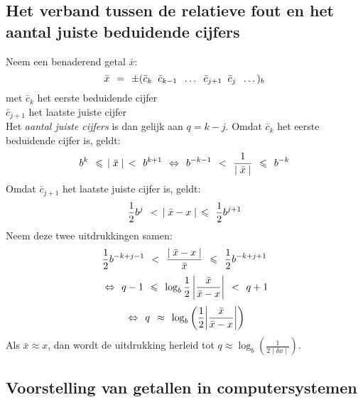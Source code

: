 \documentclass[11pt]{report}
\def \eq {\hspace{1.5mm}=\hspace{1.5mm}}
\def \lesseq {\hspace{1.5mm}\leqslant\hspace{1.5mm}}
\def \less {\hspace{1.5mm}<\hspace{1.5mm}}
\def \lrarrow {\hspace{1.5mm}\Leftrightarrow \hspace{1.5mm}}
\def \appx {\hspace{1.5mm}\approx \hspace{1.5mm}}
\def \h {\hspace{2mm}}
\begin{document}
	\subsection{Het verband tussen de relatieve fout en het aantal juiste beduidende cijfers}
	 Neem een benaderend getal $\bar x$:
	 $$\bar x \eq \pm (\bar c_k \h \bar c_{k-1} \h \dots \h \bar c_{j+1} \h \bar c_j \h \dots)_b$$
	 \hspace*{8.5mm}met \h $\bar c_k$ \hspace{5mm} het eerste beduidende cijfer\\
	 \hspace*{17mm} $\bar c_{j+1}$ \hspace{1.4mm} het laatste juiste cijfer\\
	 Het \textit{aantal juiste cijfers} is dan gelijk aan $q = k - j$. Omdat $\bar c_k$ het eerste beduidende cijfer is, geldt:
	 \begin{equation}
	 	b^k \lesseq \mid \bar x \mid \less b^{k+1} \lrarrow b^{-k-1} \less \frac{1}{\mid \bar x \mid} \lesseq b^{-k}
	 \end{equation}
	 Omdat $\bar c _{j+1}$ het laatste juiste cijfer is, geldt:
	 \begin{equation}
	 	\frac{1}{2} b^j \less \mid \bar x - x \mid \lesseq \frac{1}{2} b^{j+1}
	 \end{equation}
	 Neem deze twee uitdrukkingen samen:
	 \begin{equation}
	 	\frac{1}{2} b^{-k+j-1} \less \frac{\mid \bar x - x \mid}{\bar x} \lesseq \frac{1}{2} b^{-k+j+1}
	 \end{equation}
	 \begin{equation}
	 	\lrarrow q - 1 \lesseq \log_b\frac{1}{2}\left| \frac{\bar x}{\bar x - x}\right| \less q + 1
	 \end{equation}
	 \begin{equation}
	 	\lrarrow q \appx \log_b \left(\frac{1}{2}\bigg|\frac{\bar x}{\bar x - x} \bigg| \right )
	 \end{equation}
	 Als $\bar x \approx x$, dan wordt de uitdrukking herleid tot $q \approx \log_b\left(\frac{1}{2\mid \delta x\mid}\right)$.
	 
	\subsection{Voorstelling van getallen in computersystemen}
\end{document}

